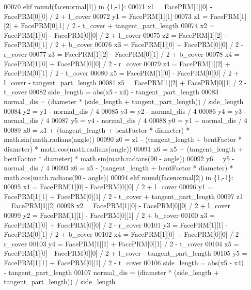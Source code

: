 \begin{DoxyCode}
00070     \textcolor{keywordflow}{elif} round(facenormal[1]) \textcolor{keywordflow}{in} \{1,-1\}:
00071         x1 = FacePRM[1][0] - FacePRM[0][0] / 2 + l\_cover
00072         y1 = FacePRM[1][1]
00073         z1 = FacePRM[1][2] + FacePRM[0][1] / 2 - t\_cover + tangent\_part\_length
00074         x2 = FacePRM[1][0] - FacePRM[0][0] / 2 + l\_cover
00075         z2 = FacePRM[1][2] - FacePRM[0][1] / 2 + b\_cover
00076         x3 = FacePRM[1][0] + FacePRM[0][0] / 2 - r\_cover
00077         z3 = FacePRM[1][2] - FacePRM[0][1] / 2 + b\_cover
00078         x4 = FacePRM[1][0] + FacePRM[0][0] / 2 - r\_cover
00079         z4 = FacePRM[1][2] + FacePRM[0][1] / 2 - t\_cover
00080         x5 = FacePRM[1][0] - FacePRM[0][0] / 2 + l\_cover - tangent\_part\_length
00081         z5 = FacePRM[1][2] + FacePRM[0][1] / 2 - t\_cover
00082         side\_length = abs(x5 - x4) - tangent\_part\_length
00083         normal\_dis = (diameter * (side\_length + tangent\_part\_length)) / side\_length
00084         y2 = y1 - normal\_dis / 4
00085         y3 = y2 - normal\_dis / 4
00086         y4 = y3 - normal\_dis / 4
00087         y5 = y4 - normal\_dis / 4
00088         y0 = y1 + normal\_dis / 4
00089         x0 = x1 + (tangent\_length + bentFactor * diameter) * math.sin(math.radians(angle))
00090         z0 = z1 - (tangent\_length + bentFactor * diameter) * math.cos(math.radians(angle))
00091         x6 = x5 + (tangent\_length + bentFactor * diameter) * math.sin(math.radians(90 - angle))
00092         y6 = y5 - normal\_dis / 4
00093         z6 = z5 - (tangent\_length + bentFactor * diameter) * math.cos(math.radians(90 - angle))
00094     \textcolor{keywordflow}{elif} round(facenormal[2]) \textcolor{keywordflow}{in} \{1,-1\}:
00095         x1 = FacePRM[1][0] - FacePRM[0][0] / 2 + l\_cover
00096         y1 = FacePRM[1][1] + FacePRM[0][1] / 2 - t\_cover + tangent\_part\_length
00097         z1 = FacePRM[1][2]
00098         x2 = FacePRM[1][0] - FacePRM[0][0] / 2 + l\_cover
00099         y2 = FacePRM[1][1] - FacePRM[0][1] / 2 + b\_cover
00100         x3 = FacePRM[1][0] + FacePRM[0][0] / 2 - r\_cover
00101         y3 = FacePRM[1][1] - FacePRM[0][1] / 2 + b\_cover
00102         x4 = FacePRM[1][0] + FacePRM[0][0] / 2 - r\_cover
00103         y4 = FacePRM[1][1] + FacePRM[0][1] / 2 - t\_cover
00104         x5 = FacePRM[1][0] - FacePRM[0][0] / 2 + l\_cover - tangent\_part\_length
00105         y5 = FacePRM[1][1] + FacePRM[0][1] / 2 - t\_cover
00106         side\_length = abs(x5 - x4) - tangent\_part\_length
00107         normal\_dis = (diameter * (side\_length + tangent\_part\_length)) / side\_length

\end{DoxyCode}
